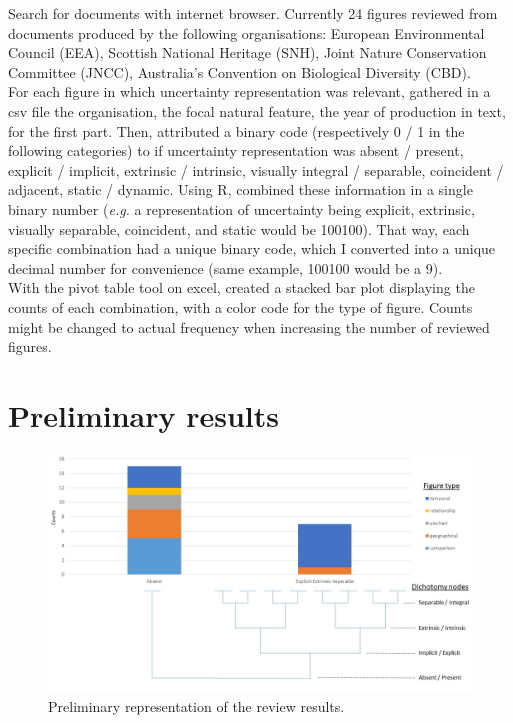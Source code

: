 \documentclass[12pt,a4paper]{article}
\begin{document}
Search for documents with internet browser.
Currently 24 figures reviewed from documents produced by the following organisations: European Environmental Council (EEA), Scottish National Heritage (SNH), Joint Nature Conservation Committee (JNCC), Australia's Convention on Biological Diversity (CBD).\\
For each figure in which uncertainty representation was relevant, gathered in a csv file the organisation, the focal natural feature, the year of production in text, for the first part.
Then, attributed a binary code (respectively 0 / 1 in the following categories) to if uncertainty representation was absent / present, explicit / implicit, extrinsic / intrinsic, visually integral / separable, coincident / adjacent, static / dynamic.
Using R, combined these information in a single binary number (\textit{e.g.} a representation of uncertainty being explicit, extrinsic, visually separable, coincident, and static would be 100100).
That way, each specific combination had a unique binary code, which I converted into a unique decimal number for convenience (same example, 100100 would be a 9).\\
With the pivot table tool on excel, created a stacked bar plot displaying the counts of each combination, with a color code for the type of figure.
Counts might be changed to actual frequency when increasing the number of reviewed figures.

\section{Preliminary results}

\begin{figure}
\centering
\includegraphics[scale=0.5]{uncertainty_representation_review_fig.jpg}
\caption{Preliminary representation of the review results.}
\label{prelifig}
\end{figure}
\end{document}

